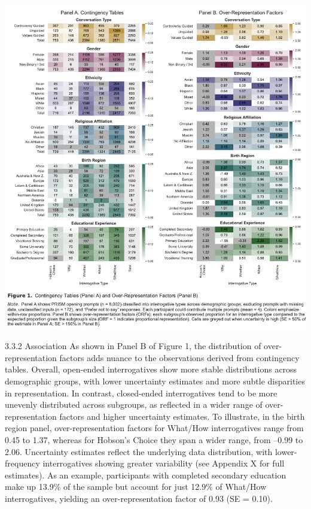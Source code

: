 \documentclass[
  12pt,
]{article}
\begin{document}
\includegraphics{../03_outputs/02_descriptive_analyses/figure_1.pdf}

3.3.2 Association
As shown in Panel B of Figure 1, the distribution of over-representation factors adds nuance to the observations derived from contingency tables. Overall, open-ended interrogatives show more stable distributions across demographic groups, with lower uncertainty estimates and more subtle disparities in representation. In contrast, closed-ended interrogatives tend to be more unevenly distributed across subgroups, as reflected in a wider range of over-representation factors and higher uncertainty estimates. To illustrate, in the birth region panel, over-representation factors for What/How interrogatives range from 0.45 to 1.37, whereas for Hobson's Choice they span a wider range, from --0.99 to 2.06. Uncertainty estimates reflect the underlying data distribution, with lower-frequency interrogatives showing greater variability (see Appendix X for full estimates). As an example, participants with completed secondary education make up 13.9\% of the sample but account for just 12.9\% of What/How interrogatives, yielding an over-representation factor of 0.93 (SE = 0.10).
\end{document}
